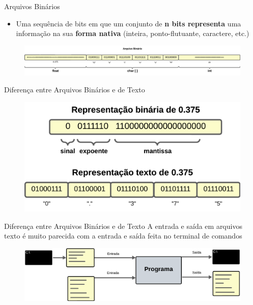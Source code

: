 \begin{frame}{Arquivos Binários}
\begin{itemize}
    \item Uma sequência de bits em que um conjunto de \textbf{n bits representa} uma informação na sua \textbf{forma nativa} (inteira, ponto-flutuante, caractere, etc.)\\
\end{itemize}
\begin{figure}
    \centering
    \includegraphics[width=1\linewidth]{figuras/binArq.png}
\end{figure}
\end{frame}


\begin{frame}{Diferença entre Arquivos Binários e de Texto}
\begin{figure}
    \centering
    \includegraphics[width=1\linewidth]{figuras/difArq.png}
\end{figure}
\end{frame}


\begin{frame}{Diferença entre Arquivos Binários e de Texto}
A entrada e saída em arquivos texto é muito parecida com a
entrada e saída feita no terminal de comandos
\begin{figure}
    \centering
    \includegraphics[width=1\linewidth]{figuras/difArq2.png}
\end{figure}
\end{frame}

